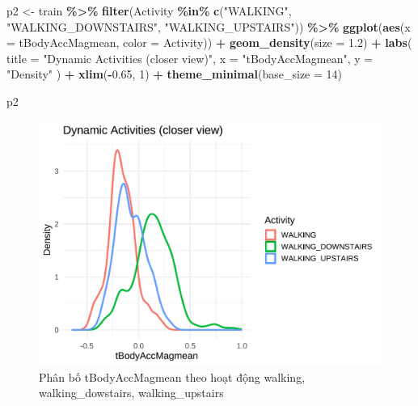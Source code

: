 \documentclass[
]{article}
\newenvironment{Shaded}{\begin{snugshade}}{\end{snugshade}}
\newcommand{\AttributeTok}[1]{\textcolor[rgb]{0.13,0.29,0.53}{#1}}
\newcommand{\DecValTok}[1]{\textcolor[rgb]{0.00,0.00,0.81}{#1}}
\newcommand{\FloatTok}[1]{\textcolor[rgb]{0.00,0.00,0.81}{#1}}
\newcommand{\FunctionTok}[1]{\textcolor[rgb]{0.13,0.29,0.53}{\textbf{#1}}}
\newcommand{\NormalTok}[1]{#1}
\newcommand{\OtherTok}[1]{\textcolor[rgb]{0.56,0.35,0.01}{#1}}
\newcommand{\SpecialCharTok}[1]{\textcolor[rgb]{0.81,0.36,0.00}{\textbf{#1}}}
\newcommand{\StringTok}[1]{\textcolor[rgb]{0.31,0.60,0.02}{#1}}
\begin{document}
\begin{Shaded}
\begin{Highlighting}[]
\NormalTok{p2 }\OtherTok{\textless{}{-}}\NormalTok{ train }\SpecialCharTok{\%\textgreater{}\%}
  \FunctionTok{filter}\NormalTok{(Activity }\SpecialCharTok{\%in\%} \FunctionTok{c}\NormalTok{(}\StringTok{"WALKING"}\NormalTok{, }\StringTok{"WALKING\_DOWNSTAIRS"}\NormalTok{, }\StringTok{"WALKING\_UPSTAIRS"}\NormalTok{)) }\SpecialCharTok{\%\textgreater{}\%}
  \FunctionTok{ggplot}\NormalTok{(}\FunctionTok{aes}\NormalTok{(}\AttributeTok{x =}\NormalTok{ tBodyAccMagmean, }\AttributeTok{color =}\NormalTok{ Activity)) }\SpecialCharTok{+}
  \FunctionTok{geom\_density}\NormalTok{(}\AttributeTok{size =} \FloatTok{1.2}\NormalTok{) }\SpecialCharTok{+}
  \FunctionTok{labs}\NormalTok{(}
    \AttributeTok{title =} \StringTok{"Dynamic Activities (closer view)"}\NormalTok{,}
    \AttributeTok{x =} \StringTok{"tBodyAccMagmean"}\NormalTok{,}
    \AttributeTok{y =} \StringTok{"Density"}
\NormalTok{  ) }\SpecialCharTok{+} \FunctionTok{xlim}\NormalTok{(}\SpecialCharTok{{-}}\FloatTok{0.65}\NormalTok{, }\DecValTok{1}\NormalTok{) }\SpecialCharTok{+}
  \FunctionTok{theme\_minimal}\NormalTok{(}\AttributeTok{base\_size =} \DecValTok{14}\NormalTok{)}

\NormalTok{p2}
\end{Highlighting}
\end{Shaded}

\begin{figure}
\centering
\includegraphics{report_files/figure-latex/unnamed-chunk-13-1.pdf}
\caption{Phân bố tBodyAccMagmean theo hoạt động walking,
walking\_dowstairs, walking\_upstairs}
\end{figure}
\end{document}
